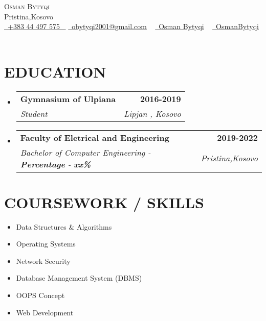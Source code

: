 \documentclass[letterpaper,11pt]{article}
\makeatletter
\newcommand{\resumeSubheading}[4]{
  \vspace{-2pt}\item
    \begin{tabular*}{1.0\textwidth}[t]{l@{\extracolsep{\fill}}r}
      \textbf{\large#1} & \textbf{\small #2} \\
      \textit{\large#3} & \textit{\small #4} \\
      
    \end{tabular*}\vspace{-7pt}
}
\newcommand{\resumeSubHeadingListStart}{\begin{itemize}[leftmargin=0.0in, label={}]}
\newcommand{\resumeSubHeadingListEnd}{\end{itemize}}
\makeatother
\begin{document}


\begin{center}
    {\Huge \scshape Osman Bytyqi} \\ \vspace{1pt}
    Pristina,Kosovo \\ \vspace{1pt}
    \small \href{tel:+383 44 497 575}{ \raisebox{-0.1\height}\faPhone\ \underline{+383 44 497 575} ~} \href{mailto:yourname@gmail.com}{\raisebox{-0.2\height}\faEnvelope\  \underline{obytyqi2001@gmail.com}} ~ 
    \href{https://www.linkedin.com/in/osman-bytyqi-bb6ba31b9/}{\raisebox{-0.2\height}\faLinkedinSquare\ \underline{Osman Bytyqi}}  ~
    \href{https://github.com/OsmanBytyqi}{\raisebox{-0.2\height}\faGithub\ \underline{OsmanBytyqi}} ~
 
    \vspace{-8pt}
\end{center}


\section{EDUCATION}
  \resumeSubHeadingListStart
    \resumeSubheading
      {Gymnasium of Ulpiana}{2016-2019}
      {Student  }{Lipjan , Kosovo}
  \resumeSubHeadingListEnd
  
  \resumeSubHeadingListStart
    \resumeSubheading
      {Faculty of Eletrical and Engineering}{2019-2022}
      {Bachelor of Computer Engineering  - \textbf{Percentage} - \textbf{xx\%}}{Pristina,Kosovo}
  \resumeSubHeadingListEnd

\section{COURSEWORK / SKILLS}
        \begin{multicols}{4}
            \begin{itemize}[itemsep=-2pt, parsep=5pt]
                \item Data Structures \& Algorithms
                \item Operating Systems
                \item Network Security
                \item Database Management System (DBMS)
                \item OOPS Concept
                \item Web Development
            \end{itemize}
        \end{multicols}
        \vspace*{3.0\multicolsep}
\end{document}
